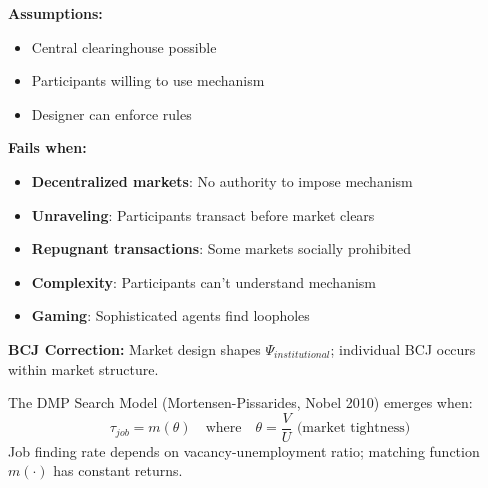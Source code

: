 \begin{tcolorbox}[colback=red!5!white, colframe=red!75!black, title=Boundary Condition: Where Market Design Fails]
\textbf{Assumptions:}
\begin{itemize}[nosep]
\item Central clearinghouse possible
\item Participants willing to use mechanism
\item Designer can enforce rules
\end{itemize}

\textbf{Fails when:}
\begin{itemize}[nosep]
\item \textbf{Decentralized markets}: No authority to impose mechanism
\item \textbf{Unraveling}: Participants transact before market clears
\item \textbf{Repugnant transactions}: Some markets socially prohibited
\item \textbf{Complexity}: Participants can't understand mechanism
\item \textbf{Gaming}: Sophisticated agents find loopholes
\end{itemize}

\textbf{BCJ Correction:} Market design shapes $\Psi_{institutional}$; individual BCJ occurs within market structure.
\end{tcolorbox}


\begin{theorem}
\label{thm:mortensen-pissarides}
The DMP Search Model (Mortensen-Pissarides, Nobel 2010) emerges when:
\begin{equation}
\boxed{\tau_{job} = m(\theta) \quad \text{where} \quad \theta = \frac{V}{U} \text{ (market tightness)}}
\end{equation}
Job finding rate depends on vacancy-unemployment ratio; matching function $m(\cdot)$ has constant returns.
\end{theorem}

